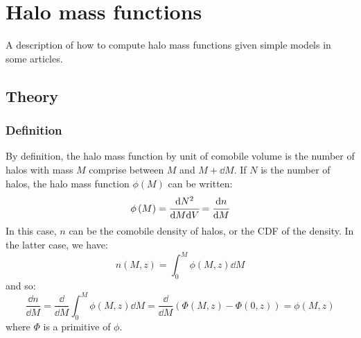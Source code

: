 \chapter{Halo mass functions}
%
A description of how to compute halo mass functions given simple models in some
articles.
%
\section{Theory}
%
\subsection{Definition}
%
By definition, the halo mass function by unit of comobile volume is the number
of halos with mass $M$ comprise between $M$ and $M+\dd{M}$. If $N$ is the
number of halos, the halo mass function $\phi\left({M}\right)$ can be written:
%
\begin{equation}
    \phi\left({M}\right)=\cfrac{{\rm{d}}{N^2}}{{\rm{d}}{M}{\rm{d}}{V}}=\cfrac{{\rm{d}}{n}}{{\rm{d}}{M}}
\end{equation}
%
In this case, $n$ can be the comobile density of halos, or the CDF of the
density. In the latter case, we have:
%
\begin{equation}
    n\left({M,z}\right)=\int_0^M{\phi\left({M,z}\right)\dd{M}}
\end{equation}
%
and so:
%
\begin{equation}
    \frac{\dd{n}}{\dd{M}}=\frac{\dd}{\dd{M}}\int_0^M{\phi\left({M,z}\right)}\dd{M}=\frac{\dd}{\dd{M}}\left({\Phi\left({M,z}\right)}-{\Phi\left({0,z}\right)}\right)={\phi\left({M,z}\right)}
\end{equation}
%
where $\Phi$ is a primitive of $\phi$.
%
